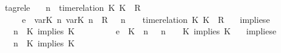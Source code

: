 \begin{isabellebody}
{\isacharbar}\ tagrel{\isacharunderscore}e{\isacharcolon}\isanewline
\ \ {\isachardoublequoteopen}{\isacharparenleft}{\isasymGamma}{\isacharcomma}\ n\ {\isasymturnstile}\ {\isacharparenleft}{\isacharparenleft}time{\isacharminus}relation\ {\isasymlfloor}K\ K\ {\isasymin}\ R{\isacharparenright}\ {\isacharhash}\ {\isasymPsi}{\isacharparenright}\ {\isasymtriangleright}\ {\isasymPhi}{\isacharparenright}\isanewline
\ \ \ \ \ {\isasymhookrightarrow}\isactrlsub e\ \ {\isacharparenleft}{\isacharparenleft}{\isacharparenleft}{\isasymlfloor}{\isasymtau}\isactrlsub v\isactrlsub a\isactrlsub r{\isacharparenleft}K\ n{\isacharparenright}{\isacharcomma}\ {\isasymtau}\isactrlsub v\isactrlsub a\isactrlsub r{\isacharparenleft}K\ n{\isacharparenright}{\isasymrfloor}\ {\isasymin}\ R{\isacharparenright}\ {\isacharhash}\ {\isasymGamma}{\isacharparenright}{\isacharcomma}\ n\ {\isasymturnstile}\ {\isasymPsi}\ {\isasymtriangleright}\ {\isacharparenleft}{\isacharparenleft}time{\isacharminus}relation\ {\isasymlfloor}K\ K\ {\isasymin}\ R{\isacharparenright}\ {\isacharhash}\ {\isasymPhi}{\isacharparenright}{\isacharparenright}{\isachardoublequoteclose}\isanewline
{\isacharbar}\ implies{\isacharunderscore}e{}{\isacharcolon}\isanewline
\ \ {\isachardoublequoteopen}{\isacharparenleft}{\isasymGamma}{\isacharcomma}\ n\ {\isasymturnstile}\ {\isacharparenleft}{\isacharparenleft}K\ implies\ K\ {\isacharhash}\ {\isasymPsi}{\isacharparenright}\ {\isasymtriangleright}\ {\isasymPhi}{\isacharparenright}\isanewline
\ \ \ \ \ {\isasymhookrightarrow}\isactrlsub e\ \ {\isacharparenleft}{\isacharparenleft}{\isacharparenleft}K\ {\isasymnot}{\isasymUp}\ n{\isacharparenright}\ {\isacharhash}\ {\isasymGamma}{\isacharparenright}{\isacharcomma}\ n\ {\isasymturnstile}\ {\isasymPsi}\ {\isasymtriangleright}\ {\isacharparenleft}{\isacharparenleft}K\ implies\ K\ {\isacharhash}\ {\isasymPhi}{\isacharparenright}{\isacharparenright}{\isachardoublequoteclose}\isanewline
{\isacharbar}\ implies{\isacharunderscore}e{}{\isacharcolon}\isanewline
\ \ {\isachardoublequoteopen}{\isacharparenleft}{\isasymGamma}{\isacharcomma}\ n\ {\isasymturnstile}\ {\isacharparenleft}{\isacharparenleft}K\ implies\ K\ {\isacharhash}\ {\isasymPsi}{\isacharparenright}\ {\isasymtriangleright}\ {\isasymPhi}{\isacharparenright}\isanewline

\end{isabellebody}
